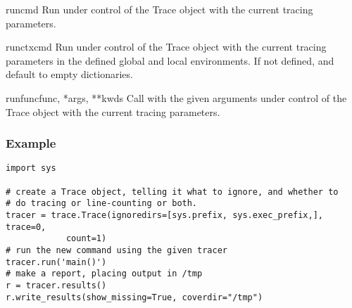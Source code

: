 \begin{methoddesc}[Trace]{run}{cmd}
Run  under control of the Trace object with the current tracing
parameters.
\end{methoddesc}

\begin{methoddesc}[Trace]{runctx}{cmd}
Run  under control of the Trace object with the current tracing
parameters in the defined global and local environments.  If not defined,
 and  default to empty dictionaries.
\end{methoddesc}

\begin{methoddesc}[Trace]{runfunc}{func, *args, **kwds}
Call  with the given arguments under control of the Trace
object with the current tracing parameters.
\end{methoddesc}

\subsubsection{Example}

\begin{verbatim}
import sys

# create a Trace object, telling it what to ignore, and whether to
# do tracing or line-counting or both.
tracer = trace.Trace(ignoredirs=[sys.prefix, sys.exec_prefix,], trace=0,
		    count=1)
# run the new command using the given tracer
tracer.run('main()')
# make a report, placing output in /tmp
r = tracer.results()
r.write_results(show_missing=True, coverdir="/tmp")
\end{verbatim}
